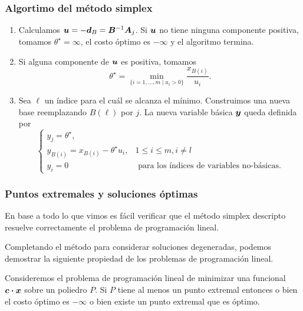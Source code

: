 \documentclass[aspectratio=169,12pt,spanish]{beamer}
\newcounter{savedenum}
\newcommand*{\resume}{\setcounter{enumi}{\thesavedenum}}
\begin{document}
\begin{frame}
\frametitle{Algortimo del método simplex}

\begin{enumerate}
\resume
\item Calculamos $\bm{u} = -\bm{d}_B = \bm{B}^{-1} \bm{A}_j$. Si $\bm{u}$ no tiene ninguna componente positiva, tomamos $\theta^\star = \infty$, el costo óptimo es $-\infty$ y el algoritmo termina.
\item Si alguna componente de $\bm{u}$ es positiva, tomamos
$$
\theta^\star = \min_{\{i = 1, \dots, m \mid u_i > 0\}} \frac{x_{B(i)}}{u_i}.
$$
\item Sea $\ell$ un índice para el cuál se alcanza el mínimo. Construimos una nueva base reemplazando $B(\ell)$ por $j$. La nueva variable básica $\bm{y}$ queda definida por
    $$
    \begin{cases}
    y_j = \theta^\star, \\
    y_{B(i)} = x_{B(i)} - \theta^\star u_i, & 1 \le i \le m, i \neq l \\
    y_i = 0 & \text{ para los índices de variables no-básicas.}
    \end{cases}
    $$
\end{enumerate}


\end{frame}


\begin{frame}
\frametitle{Puntos extremales y soluciones óptimas}

En base a todo lo que vimos es fácil verificar que el método simplex descripto resuelve correctamente el problema de programación lineal.

Completando el método para considerar soluciones degeneradas, podemos demostrar la siguiente propiedad de los problemas de programación lineal.

\vspace{0.5cm}

\begin{theorem}
Consideremos el problema de programación lineal de minimizar una funcional $\bm{c} \boldsymbol{\cdot} \bm{x}$ sobre un poliedro $P$. Si $P$ tiene al menos un punto extremal entonces o bien el costo óptimo es $-\infty$ o bien existe un punto extremal que es óptimo.
\end{theorem}


\end{frame}

\end{document}
